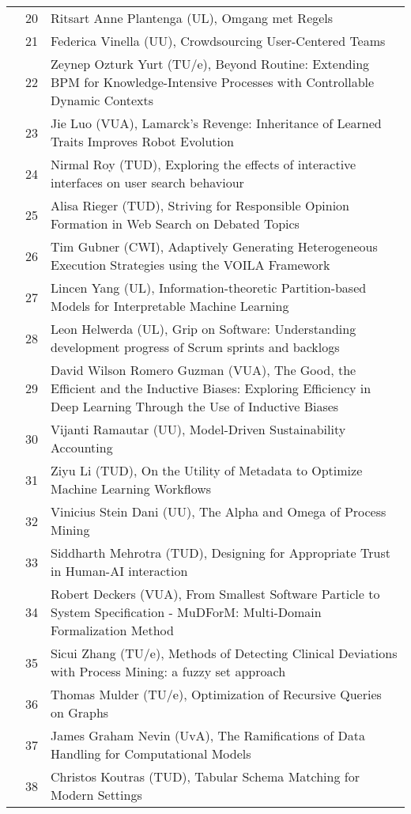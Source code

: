 \begin{xltabular}{\linewidth}{@{} l @{\hspace{0.5em}} l @{\hspace{1em}} X @{}}
	&	 20	&	Ritsart Anne Plantenga (UL), Omgang met Regels \\
	&	 21	&	Federica Vinella (UU), Crowdsourcing User-Centered Teams \\
	&	 22	&	Zeynep Ozturk Yurt (TU/e), Beyond Routine: Extending BPM for Knowledge-Intensive Processes with Controllable Dynamic Contexts \\
	&	 23	&	Jie Luo (VUA), Lamarck’s Revenge: Inheritance of Learned Traits Improves Robot Evolution \\
	&	 24	&	Nirmal Roy (TUD), Exploring the effects of interactive interfaces on user search behaviour \\
	&	 25	&	Alisa Rieger (TUD), Striving for Responsible Opinion Formation in Web Search on Debated Topics \\
	&	 26	&	Tim Gubner (CWI), Adaptively Generating Heterogeneous Execution Strategies using the VOILA Framework \\
	&	 27	&	Lincen Yang (UL), Information-theoretic Partition-based Models for Interpretable Machine Learning \\
	&	 28	&	Leon Helwerda (UL), Grip on Software: Understanding development progress of Scrum sprints and backlogs \\
	&	 29	&	David Wilson Romero Guzman (VUA), The Good, the Efficient and the Inductive Biases: Exploring Efficiency in Deep Learning Through the Use of Inductive Biases \\
	&	 30	&	Vijanti Ramautar (UU), Model-Driven Sustainability Accounting \\
	&	 31	&	Ziyu Li (TUD), On the Utility of Metadata to Optimize Machine Learning Workflows \\
	&	 32	&	Vinicius Stein Dani (UU), The Alpha and Omega of Process Mining \\
	&	 33	&	Siddharth Mehrotra (TUD), Designing for Appropriate Trust in Human-AI interaction \\
	&	 34	&	Robert Deckers (VUA), From Smallest Software Particle to System Specification - MuDForM: Multi-Domain Formalization Method \\
	&	 35	&	Sicui Zhang (TU/e), Methods of Detecting Clinical Deviations with Process Mining: a fuzzy set approach \\
	&	 36	&	Thomas Mulder (TU/e), Optimization of Recursive Queries on Graphs \\
	&	 37	&	James Graham Nevin (UvA), The Ramifications of Data Handling for Computational Models \\
	&	 38	&	Christos Koutras (TUD), Tabular Schema Matching for Modern Settings \\

\end{xltabular}
